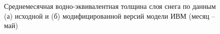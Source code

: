 \documentclass[a4paper, fontsize=14pt]{scrartcl}
\begin{document}
\begin{figure}[h]
    \begin{minipage}[h]{0.49\linewidth}
    \end{minipage}
    \hfill
    \begin{minipage}[h]{0.49\linewidth}
    \end{minipage}
    \caption{Среднемесячная водно-эквивалентная толщина слоя снега по данным (а) исходной и (б) модифицированной версий модели ИВМ (месяц -- май) }
    \label{fig:image}
\end{figure}
\end{document}
